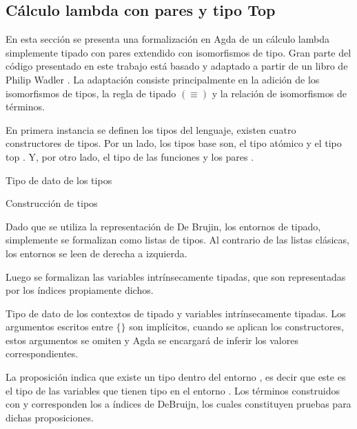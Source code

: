 \subsection{Cálculo lambda con pares y tipo Top}

En esta sección se presenta una formalización en Agda de un cálculo lambda simplemente tipado con pares extendido con isomorfismos de tipo.
Gran parte del código presentado en este trabajo está basado y adaptado a partir de un libro de Philip Wadler \cite{plfa}.
La adaptación consiste principalmente en la adición de los isomorfismos de tipos, la regla de tipado $(\equiv)$ y la relación de isomorfismos de términos.

En primera instancia se definen los tipos del lenguaje, existen cuatro constructores de tipos.
Por un lado, los tipos base son, el tipo atómico \const{$\tau$} y el tipo top \const{$\top$}.
Y, por otro lado, el tipo de las funciones \const{$\_\Rightarrow\_$} y los pares \const{$\_\times\_$}.

\begin{codigo}
	Tipo de dato de los tipos
	
\end{codigo}

\begin{example}
	Construcción de tipos
\end{example}

Dado que se utiliza la representación de De Brujin, los entornos de tipado, simplemente se formalizan como listas de tipos.
Al contrario de las listas clásicas, los entornos se leen de derecha a izquierda.

Luego se formalizan las variables intrínsecamente tipadas, que son representadas por los índices propiamente dichos.

\begin{codigo}
	Tipo de dato de los contextos de tipado y variables intrínsecamente tipadas.
	Los argumentos escritos entre $\{\}$ son implícitos, cuando se aplican los constructores, estos argumentos se omiten y Agda se encargará de inferir los valores correspondientes.
\end{codigo}

La proposición \bound{$\Gamma$} \const{$\ni$}  indica que existe un tipo  dentro del entorno \bound{$\Gamma$}, es decir que este es el tipo de las variables que tienen tipo  en el entorno \bound{$\Gamma$}.
Los términos construidos con  y  corresponden los a índices de DeBruijn, los cuales constituyen pruebas para dichas proposiciones.

